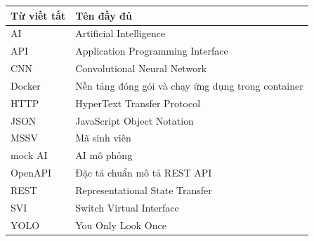 
\begin{table}[H]
\centering
\ReportTableFont
\begin{tabular}{|>{\raggedright\arraybackslash}p{4cm}|>{\raggedright\arraybackslash}p{9.5cm}|}
\hline
\textbf{Từ viết tắt} & \textbf{Tên đầy đủ} \\
\hline
AI & Artificial Intelligence \\
\hline
API & Application Programming Interface \\
\hline
CNN & Convolutional Neural Network \\
\hline
Docker & Nền tảng đóng gói và chạy ứng dụng trong container \\
\hline
HTTP & HyperText Transfer Protocol \\
\hline
JSON & JavaScript Object Notation \\
\hline
MSSV & Mã sinh viên \\
\hline
mock AI & AI mô phỏng \\
\hline
OpenAPI & Đặc tả chuẩn mô tả REST API \\
\hline
REST & Representational State Transfer \\
\hline
SVI & Switch Virtual Interface \\
\hline
YOLO & You Only Look Once \\
\hline
\end{tabular}
\normalsize
\end{table}
